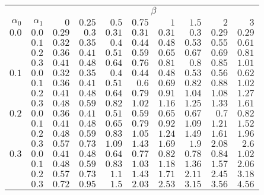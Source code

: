 \begin{tabular}{rr|rrrrrrrr}
\hline\hline
 && \multicolumn{8}{c}{$\beta$}\\
 $\alpha_0$ & $\alpha_1$ & $0$ & $0.25$ & $0.5$ & $0.75$ & $1$ & $1.5$ & $2$ & $3$ \\ 
 \hline
$0.0$ & $0.0$ & $0.29$ & $0.3$ & $0.31$ & $0.31$ & $0.31$ & $0.3$ & $0.29$ & $0.29$\\ 
 & $0.1$ & $0.32$ & $0.35$ & $0.4$ & $0.44$ & $0.48$ & $0.53$ & $0.55$ & $0.61$\\ 
 & $0.2$ & $0.36$ & $0.41$ & $0.51$ & $0.59$ & $0.65$ & $0.67$ & $0.69$ & $0.81$\\ 
 & $0.3$ & $0.41$ & $0.48$ & $0.64$ & $0.76$ & $0.81$ & $0.8$ & $0.85$ & $1.01$\\ 
\hline 
 $0.1$ & $0.0$ & $0.32$ & $0.35$ & $0.4$ & $0.44$ & $0.48$ & $0.53$ & $0.56$ & $0.62$\\ 
 & $0.1$ & $0.36$ & $0.41$ & $0.51$ & $0.6$ & $0.69$ & $0.82$ & $0.88$ & $1.02$\\ 
 & $0.2$ & $0.41$ & $0.48$ & $0.64$ & $0.79$ & $0.91$ & $1.04$ & $1.08$ & $1.27$\\ 
 & $0.3$ & $0.48$ & $0.59$ & $0.82$ & $1.02$ & $1.16$ & $1.25$ & $1.33$ & $1.61$\\ 
\hline 
 $0.2$ & $0.0$ & $0.36$ & $0.41$ & $0.51$ & $0.59$ & $0.65$ & $0.67$ & $0.7$ & $0.82$\\ 
 & $0.1$ & $0.41$ & $0.48$ & $0.65$ & $0.79$ & $0.92$ & $1.09$ & $1.21$ & $1.52$\\ 
 & $0.2$ & $0.48$ & $0.59$ & $0.83$ & $1.05$ & $1.24$ & $1.49$ & $1.61$ & $1.96$\\ 
 & $0.3$ & $0.57$ & $0.73$ & $1.09$ & $1.43$ & $1.69$ & $1.9$ & $2.08$ & $2.6$\\ 
\hline 
 $0.3$ & $0.0$ & $0.41$ & $0.48$ & $0.64$ & $0.77$ & $0.82$ & $0.78$ & $0.84$ & $1.02$\\ 
 & $0.1$ & $0.48$ & $0.59$ & $0.83$ & $1.03$ & $1.18$ & $1.36$ & $1.57$ & $2.06$\\ 
 & $0.2$ & $0.57$ & $0.73$ & $1.1$ & $1.43$ & $1.71$ & $2.11$ & $2.45$ & $3.18$\\ 
 & $0.3$ & $0.72$ & $0.95$ & $1.5$ & $2.03$ & $2.53$ & $3.15$ & $3.56$ & $4.56$\\ 
 \hline 
 \end{tabular}